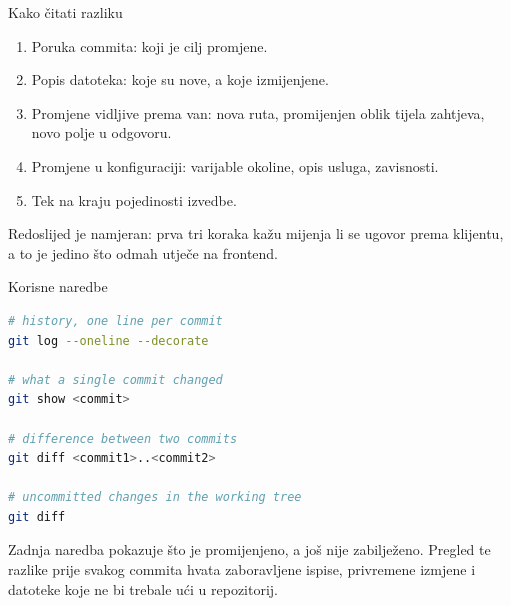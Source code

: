 \begin{frame}{Kako čitati razliku}
\begin{enumerate}
  \item Poruka commita: koji je cilj promjene.
  \item Popis datoteka: koje su nove, a koje izmijenjene.
  \item Promjene vidljive prema van: nova ruta, promijenjen oblik tijela zahtjeva, novo polje u odgovoru.
  \item Promjene u konfiguraciji: varijable okoline, opis usluga, zavisnosti.
  \item Tek na kraju pojedinosti izvedbe.
\end{enumerate}

\vspace{0.4em}
Redoslijed je namjeran: prva tri koraka kažu mijenja li se ugovor prema klijentu, a to je jedino što odmah utječe na frontend.
\end{frame}

\begin{frame}[fragile]{Korisne naredbe}
\begin{lstlisting}[language=bash]
# history, one line per commit
git log --oneline --decorate

# what a single commit changed
git show <commit>

# difference between two commits
git diff <commit1>..<commit2>

# uncommitted changes in the working tree
git diff
\end{lstlisting}

\vspace{0.4em}
Zadnja naredba pokazuje što je promijenjeno, a još nije zabilježeno. Pregled te razlike prije svakog commita hvata zaboravljene ispise, privremene izmjene i datoteke koje ne bi trebale ući u repozitorij.
\end{frame}

